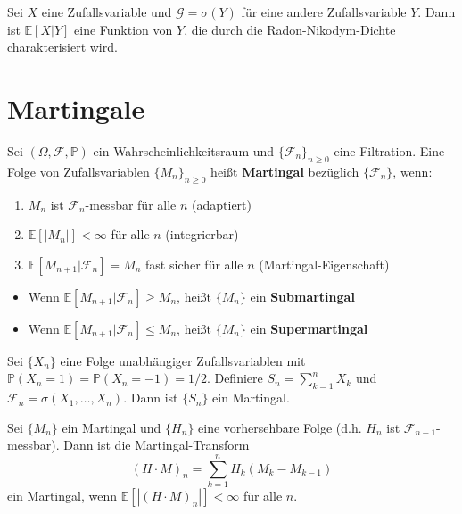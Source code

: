 \begin{example}
Sei $X$ eine Zufallsvariable und $\mathcal{G} = \sigma(Y)$ für eine andere Zufallsvariable $Y$. Dann ist $\mathbb{E}[X | Y]$ eine Funktion von $Y$, die durch die Radon-Nikodym-Dichte charakterisiert wird.
\end{example}

\section{Martingale}

\begin{definition}[Martingal]
Sei $(\Omega, \mathcal{F}, \mathbb{P})$ ein Wahrscheinlichkeitsraum und $\{\mathcal{F}_n\}_{n \geq 0}$ eine Filtration. Eine Folge von Zufallsvariablen $\{M_n\}_{n \geq 0}$ heißt \textbf{Martingal} bezüglich $\{\mathcal{F}_n\}$, wenn:

\begin{enumerate}
    \item $M_n$ ist $\mathcal{F}_n$-messbar für alle $n$ (adaptiert)
    \item $\mathbb{E}[|M_n|] < \infty$ für alle $n$ (integrierbar)
    \item $\mathbb{E}[M_{n+1} | \mathcal{F}_n] = M_n$ fast sicher für alle $n$ (Martingal-Eigenschaft)
\end{enumerate}
\end{definition}

\begin{definition}
\begin{itemize}
    \item Wenn $\mathbb{E}[M_{n+1} | \mathcal{F}_n] \geq M_n$, heißt $\{M_n\}$ ein \textbf{Submartingal}
    \item Wenn $\mathbb{E}[M_{n+1} | \mathcal{F}_n] \leq M_n$, heißt $\{M_n\}$ ein \textbf{Supermartingal}
\end{itemize}
\end{definition}

\begin{example}
Sei $\{X_n\}$ eine Folge unabhängiger Zufallsvariablen mit $\mathbb{P}(X_n = 1) = \mathbb{P}(X_n = -1) = 1/2$. Definiere $S_n = \sum_{k=1}^n X_k$ und $\mathcal{F}_n = \sigma(X_1, \ldots, X_n)$. Dann ist $\{S_n\}$ ein Martingal.
\end{example}

\begin{theorem}
Sei $\{M_n\}$ ein Martingal und $\{H_n\}$ eine vorhersehbare Folge (d.h. $H_n$ ist $\mathcal{F}_{n-1}$-messbar). Dann ist die Martingal-Transform
\begin{equation}
(H \cdot M)_n = \sum_{k=1}^n H_k (M_k - M_{k-1})
\end{equation}
ein Martingal, wenn $\mathbb{E}[|(H \cdot M)_n|] < \infty$ für alle $n$.
\end{theorem}

